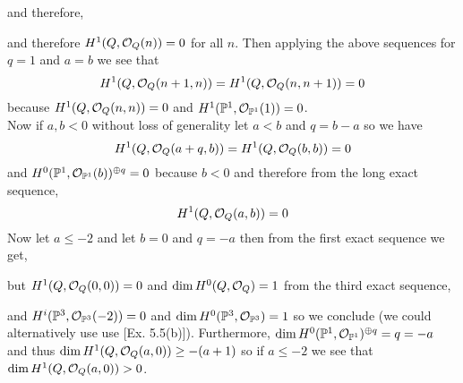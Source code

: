 \documentclass[12pt]{article}
\begin{document}
\begin{enumerate}
\begin{center}
\begin{tikzcd}
\end{tikzcd}
\end{center}
and therefore, 
\begin{center}
\end{center}
and therefore $H^1(Q, \struct{Q}(n)) = 0$ for all $n$. Then applying the above sequences for $q = 1$ and $a = b$ we see that
\[ H^1(Q, \struct{Q}(n+1, n)) = H^1(Q, \struct{Q}(n,n+1)) = 0 \] because $H^1(Q, \struct{Q}(n,n)) = 0$ and $H^1(\P^1, \struct{\P^1}(1)) = 0$.
\bigskip\\
Now if $a,b < 0$ without loss of generality let $a < b$ and $q = b - a$ so we have 
\[ H^1(Q, \struct{Q}(a+q,b)) = H^1(Q, \struct{Q}(b,b)) = 0 \]
and $H^0(\P^1, \struct{\P^1}(b))^{\oplus q} = 0$ because $b < 0$ and therefore from the long exact sequence,
\[ H^1(Q, \struct{Q}(a,b)) = 0 \]
Now let $a \le -2$ and let $b = 0$ and $q = -a$ then from the first exact sequence we get,
\begin{center}
\end{center}
but $H^1(Q, \struct{Q}(0,0)) = 0$ and $\dim H^0(Q, \struct{Q}) = 1$ from the third exact sequence,
\begin{center}
\end{center} 
and $H^i(\P^3, \struct{\P^3}(-2)) = 0$ and $\dim H^0(\P^3, \struct{\P^3}) = 1$ so we conclude (we could alternatively use use [Ex. 5.5(b)]). Furthermore, $\dim H^0(\P^1, \struct{\P^1})^{\oplus q} = q = -a$ and thus $\dim H^1(Q, \struct{Q}(a,0)) \ge -(a+1)$ so if $a \le -2$ we see that $\dim H^1(Q, \struct{Q}(a,0)) > 0$.


\end{enumerate}
\end{document}
